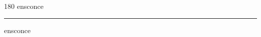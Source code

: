 
\begin{frame}
\begin{center}
\begin{turn}{180}
{\fontsize{2.5cm}{1em}\selectfont ensconce}
\end{turn}
\vspace{1em}\par  
\hrule
\vspace{1em}\par  
{\fontsize{2.5cm}{1em}\selectfont ensconce}
\end{center}
\end{frame}
